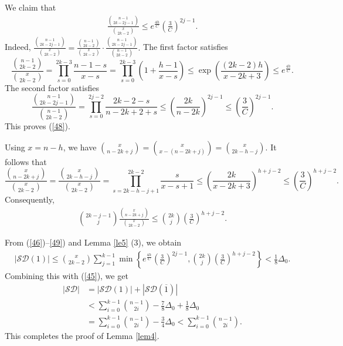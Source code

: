 \documentclass[11pt]{article}
\numberwithin{equation}{section}
\begin{document}
 We  claim that
\begin{align}
\frac{\binom{n-1}{2k-2j-1}}{\binom{x}{2k-2}}
\le e^{\frac{4h}{C}}\left(\frac{3}{C}\right)^{2j-1}. \label{48}
\end{align}
Indeed,
$
\frac{\binom{n-1}{2k-2j-1}}{\binom{x}{2k-2}}
=
\frac{\binom{n-1}{2k-2}}{\binom{x}{2k-2}}
\cdot
\frac{\binom{n-1}{2k-2j-1}}{\binom{n-1}{2k-2}}.
$
The first factor satisfies
$$
\frac{\binom{n-1}{2k-2}}{\binom{x}{2k-2}}
= \prod_{s=0}^{2k-3}\frac{n-1-s}{x-s}
= \prod_{s=0}^{2k-3}\left(1+\frac{h-1}{x-s}\right)
\le \exp\left(\frac{(2k-2)h}{x-2k+3}\right)
\le e^{\frac{4h}{C}}.
$$
The second factor satisfies
$$
\frac{\binom{n-1}{2k-2j-1}}{\binom{n-1}{2k-2}}
= \prod_{s=0}^{2j-2}\frac{2k-2-s}{n-2k+2+s}
\le \left(\frac{2k}{n-2k}\right)^{2j-1}
\le \left(\frac{3}{C}\right)^{2j-1}.
$$
This proves (\ref{48}).


Using $x=n-h$, we have
$
\binom{x}{n-2k+j}=\binom{x}{x-(n-2k+j)}=\binom{x}{2k-h-j}.
$
It follows that
$$
\frac{\binom{x}{n-2k+j}}{\binom{x}{2k-2}}
=
\frac{\binom{x}{2k-h-j}}{\binom{x}{2k-2}}
= \prod_{s=2k-h-j+1}^{2k-2}\frac{s}{x-s+1}
\le \left(\frac{2k}{x-2k+3}\right)^{h+j-2}
\le \left(\frac{3}{C}\right)^{h+j-2}.
$$
Consequently,
\begin{align}
\binom{2k-j-1}{j}
\frac{\binom{x}{n-2k+j}}{\binom{x}{2k-2}}
\le \binom{2k}{j}\left(\frac{3}{C}\right)^{h+j-2}. \label{49}
\end{align}

From (\ref{46})--\ref{49}) and Lemma \ref{le5} (3), we obtain
\begin{align*}
|\mathcal{SD}(1)|
\le\binom{x}{2k-2}
\sum_{j=1}^{k-1}
\min\left\{
e^{\frac{4h}{C}}\left(\frac{3}{C}\right)^{2j-1},
\binom{2k}{j}\left(\frac{3}{C}\right)^{h+j-2}
\right\}<\frac{1}{8}\Delta_0.
\end{align*}
Combining this with (\ref{45}), we get
\begin{align*}|\mathcal{SD}|&=|\mathcal{SD}(1)|+|\mathcal{SD}(\overline{1})|\\
&< \sum_{i=0}^{k-1}\binom{n-1}{2i}
-\frac{7}{8}\Delta_0 + \frac{1}{8}\Delta_0 \\
&= \sum_{i=0}^{k-1}\binom{n-1}{2i}
-\frac{3}{4}\Delta_0<\sum_{i=0}^{k-1}\binom{n-1}{2i}.
\end{align*}
This completes the proof of Lemma \ref{lem4}.
\end{document}
